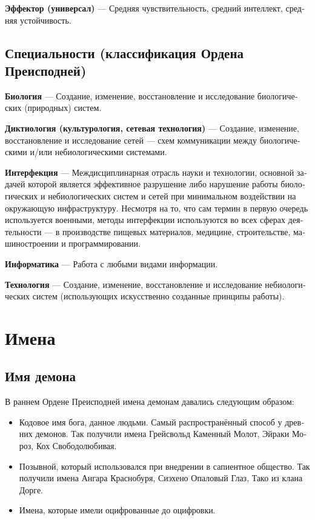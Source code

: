 \documentclass[a4paper,12pt,fleqn]{book}\usepackage{polyglossia}\setdefaultlanguage[babelshorthands=true]{russian}\setotherlanguage{english}\defaultfontfeatures{Ligatures=TeX,Mapping=tex-text}\usepackage{xcolor}\newcommand{\ml}[3]{#2}
\newcommand{\theterm}[3]{\textbf{\hypertarget{#1}{#2}} --- #3}
\begin{document}
{\theterm{effector}
{Эффектор (универсал)}
{Средняя чувствительность, средний интеллект, средняя устойчивость.}

\section{Специальности (классификация Ордена Преисподней)}

\theterm{biology}
{Биология}
{Создание, изменение, восстановление и исследование биологических (природных) систем.}

\theterm{dictiology}
{Диктиология (культурология, сетевая технология)}
{Создание, изменение, восстановление и исследование сетей --- схем коммуникации между биологическими и/или небиологическими системами.}

\theterm{interfection}
{Интерфекция}
{Междисциплинарная отрасль науки и технологии, основной задачей которой является эффективное разрушение либо нарушение работы биологических и небиологических систем и сетей при минимальном воздействии на окружающую инфраструктуру.
Несмотря на то, что сам термин в первую очередь используется военными, методы интерфекции используются во всех сферах деятельности --- в производстве пищевых материалов, медицине, строительстве, машиностроении и программировании.}

\theterm{informatics}
{Информатика}
{Работа с любыми видами информации.}

\theterm{technology}
{Технология}
{Создание, изменение, восстановление и исследование небиологических систем (использующих искусственно созданные принципы работы).}

\chapter{Имена}

\section{Имя демона}

В раннем Ордене Преисподней имена демонам давались следующим образом:

\begin{itemize}
\item Кодовое имя бога, данное людьми.
Самый распространённый способ у древних демонов.
Так получили имена Грейсвольд Каменный Молот, Эйраки Мороз, Кох Свободолюбивая.
\item Позывной, который использовался при внедрении в сапиентное общество.
Так получили имена Ангара Краснобуря, Сиэхено Опаловый Глаз, Тако из клана Дорге.
\item Имена, которые имели оцифрованные до оцифровки.
\end{itemize}

}
\end{document}
